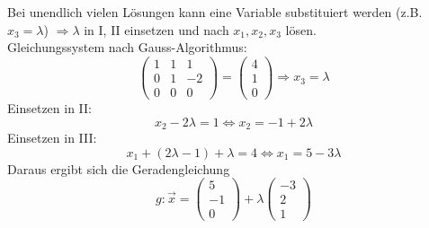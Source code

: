 Bei unendlich vielen Lösungen kann eine Variable substituiert werden (z.B. $x_3 = \lambda$) $\Rightarrow \lambda$ 
in I, II einsetzen und nach $x_1, x_2, x_3$ lösen.\\
Gleichungssystem nach Gauss-Algorithmus:
\begin{displaymath}
	\left(\begin{matrix}
		1 & 1 & 1 \\ 0 & 1 & -2 \\ 0 & 0 & 0
	\end{matrix}\right)	
	= \left(\begin{matrix}
		4 \\ 1 \\ 0
	\end{matrix}\right) \Rightarrow x_3 = \lambda
\end{displaymath}
Einsetzen in II:
\begin{displaymath} x_2 - 2 \lambda = 1 \Leftrightarrow x_2 = -1 + 2 \lambda \end{displaymath}
Einsetzen in III:
\begin{displaymath} x_1 + (2\lambda -1) + \lambda = 4 \Leftrightarrow x_1 = 5 - 3\lambda \end{displaymath}
Daraus ergibt sich die Geradengleichung
\begin{displaymath}
	g: \overrightarrow{x} = \left(\begin{matrix}5\\-1\\0\end{matrix}\right) + \lambda
	\left(\begin{matrix}-3\\2\\1\end{matrix}\right)
\end{displaymath}
